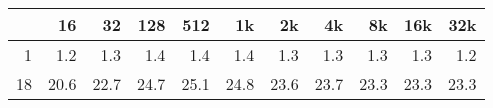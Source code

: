 \begin{tabular}{r | r r r r r r r r r r}
 	 &16	 &32	 &128	 &512	 &1k	 &2k	 &4k	 &8k	 &16k	 &32k	\\ \hline
1	& 1.2	& 1.3	& 1.4	& 1.4	& 1.4	& 1.3	& 1.3	& 1.3	& 1.3	& 1.2	\\
18	& 20.6	& 22.7	& 24.7	& 25.1	& 24.8	& 23.6	& 23.7	& 23.3	& 23.3	& 23.3	\\
\end{tabular}
